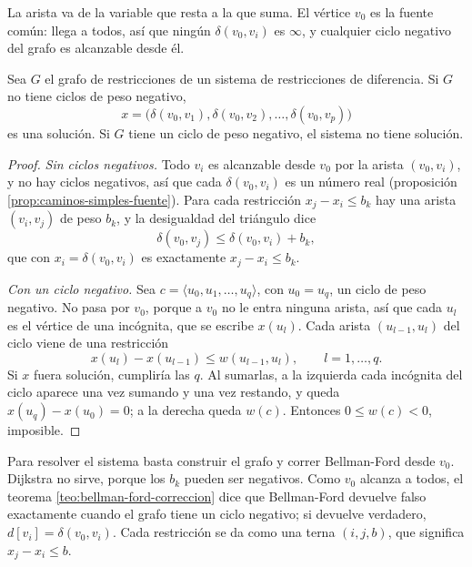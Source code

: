 \documentclass[11pt,letterpaper]{article}
\begin{document}
La arista va de la variable que resta a la que suma. El vértice $v_0$
es la fuente común: llega a todos, así que ningún $\delta(v_0, v_i)$
es $\infty$, y cualquier ciclo negativo del grafo es alcanzable desde
él.

\begin{teorema}\label{teo:restricciones-solucion}
  Sea $G$ el grafo de restricciones de un sistema de restricciones de
  diferencia. Si $G$ no tiene ciclos de peso negativo,
  \[
    x = \bigl(\delta(v_0, v_1), \delta(v_0, v_2), \dots,
             \delta(v_0, v_p)\bigr)
  \]
  es una solución. Si $G$ tiene un ciclo de peso negativo, el sistema
  no tiene solución.
\end{teorema}

\begin{proof}
  \textit{Sin ciclos negativos.} Todo $v_i$ es alcanzable desde $v_0$
  por la arista $(v_0, v_i)$, y no hay ciclos negativos, así que cada
  $\delta(v_0, v_i)$ es un número real (proposición
  \ref{prop:caminos-simples-fuente}). Para cada restricción
  $x_j - x_i \le b_k$ hay una arista $(v_i, v_j)$ de peso $b_k$, y la
  desigualdad del triángulo dice
  \[
    \delta(v_0, v_j) \le \delta(v_0, v_i) + b_k ,
  \]
  que con $x_i = \delta(v_0, v_i)$ es exactamente
  $x_j - x_i \le b_k$.

  \textit{Con un ciclo negativo.} Sea
  $c = \langle u_0, u_1, \dots, u_q\rangle$, con $u_0 = u_q$, un ciclo
  de peso negativo. No pasa por $v_0$, porque a $v_0$ no le entra
  ninguna arista, así que cada $u_l$ es el vértice de una incógnita,
  que se escribe $x(u_l)$. Cada arista $(u_{l-1}, u_l)$ del ciclo
  viene de una restricción
  \[
    x(u_l) - x(u_{l-1}) \le w(u_{l-1}, u_l) ,
    \qquad l = 1, \dots, q .
  \]
  Si $x$ fuera solución, cumpliría las $q$. Al sumarlas, a la
  izquierda cada incógnita del ciclo aparece una vez sumando y una vez
  restando, y queda $x(u_q) - x(u_0) = 0$; a la derecha queda
  $w(c)$. Entonces $0 \le w(c) < 0$, imposible.
\end{proof}

Para resolver el sistema basta construir el grafo y correr
Bellman-Ford desde $v_0$. Dijkstra no sirve, porque los $b_k$ pueden
ser negativos. Como $v_0$ alcanza a todos, el teorema
\ref{teo:bellman-ford-correccion} dice que Bellman-Ford devuelve falso
exactamente cuando el grafo tiene un ciclo negativo; si devuelve
verdadero, $d[v_i] = \delta(v_0, v_i)$. Cada restricción se da como
una terna $(i, j, b)$, que significa $x_j - x_i \le b$.
\end{document}
